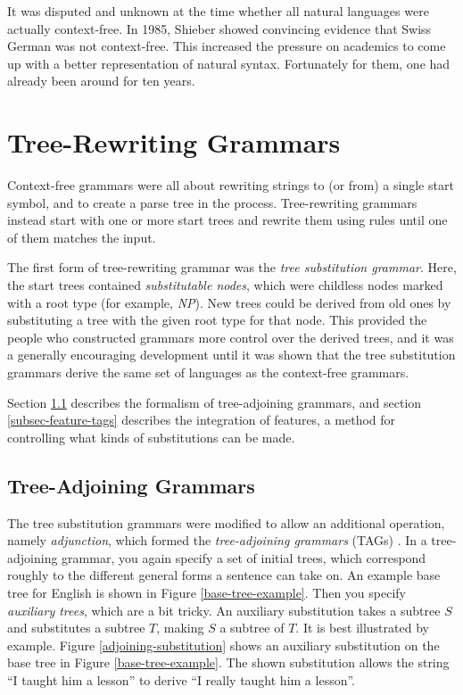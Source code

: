 \documentclass[12pt]{article}
\newcommand{\defn}[1]{\textit{#1}}
\begin{document}
It was disputed and unknown at the time whether all natural languages
were actually context-free.  In 1985, Shieber\cite{Shieber-1985} showed
convincing evidence that Swiss German was not context-free.  This
increased the pressure on academics to come up with a better
representation of natural syntax.  Fortunately for them, one had already
been around for ten years.

\section{Tree-Rewriting Grammars}
\label{sec-tree-rewriting-grammars}

Context-free grammars were all about rewriting strings to (or from) a
single start symbol, and to create a parse tree in the process.
Tree-rewriting grammars instead start with one or more start trees and
rewrite them using rules until one of them matches the input. 

The first form of tree-rewriting grammar was the \defn{tree substitution
grammar}.  Here, the start trees contained \defn{substitutable nodes},
which were childless nodes marked with a root type (for example,
\textit{NP}).  New trees could be derived from old ones by substituting
a tree with the given root type for that node.  This provided the people
who constructed grammars more control over the derived trees, and it was
a generally encouraging development until it was shown that the tree
substitution grammars derive the same set of languages as the
context-free grammars.

Section \ref{subsec-tags} describes the formalism of tree-adjoining
grammars, and section \ref{subsec-feature-tags} describes the
integration of features, a method for controlling what kinds of
substitutions can be made.

\subsection{Tree-Adjoining Grammars}
\label{subsec-tags}

The tree substitution grammars were modified to allow an additional
operation, namely \defn{adjunction}, which formed the
\defn{tree-adjoining grammars} (TAGs) \cite{Joshi-1975}.  In a tree-adjoining grammar, you
again specify a set of initial trees, which correspond roughly to the
different general forms a sentence can take on.  An example base tree
for English is shown in Figure \ref{base-tree-example}.  Then you
specify \defn{auxiliary trees}, which are a bit tricky.  An auxiliary
substitution takes a subtree $S$ and substitutes a subtree $T$, making
$S$ a subtree of $T$.  It is best illustrated by example.  Figure
\ref{adjoining-substitution} shows an auxiliary substitution on the base
tree in Figure \ref{base-tree-example}.  The shown substitution allows
the string ``I taught him a lesson'' to derive ``I really taught him a
lesson''.
\end{document}
